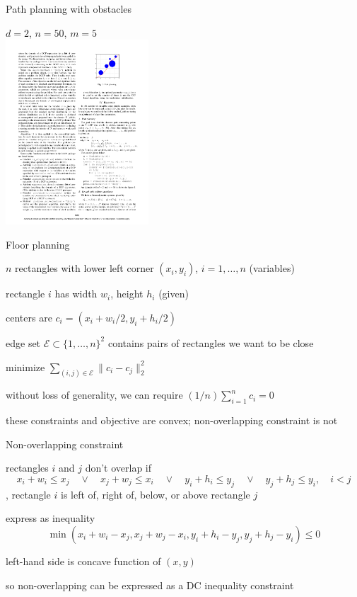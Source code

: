\documentclass[aspectratio=169,11pt]{beamer}
\begin{document}
\begin{frame}[fragile]{Path planning with obstacles}
\begin{center}
$d=2$, $n=50$, $m=5$ \\
\includegraphics[width=0.4\textwidth]{path_planning.pdf}
\end{center}
\end{frame}

\begin{frame}{Floor planning}
\BIT
\item $n$ rectangles with lower left corner $(x_i, y_i)$, $i=1,\ldots, n$ (variables)
\item rectangle $i$ has width $w_i$, height $h_i$ (given)
\item centers are $c_i = (x_i+w_i/2, y_i + h_i/2)$
\item edge set $\mathcal{E} \subset \{1,\ldots, n\}^2$ 
contains pairs of rectangles we want to be close
\item minimize $\sum_{(i,j)\in \mathcal E} \|c_i - c_j\|_2^2$
\item without loss of generality, we can require
$(1/n)\sum_{i=1}^{n} c_i = 0$
\item these constraints and objective are convex; non-overlapping constraint is not
\EIT
\end{frame}

\begin{frame}{Non-overlapping constraint}
\BIT
\item rectangles $i$ and $j$ don't overlap if
\[
x_i + w_i \leq x_j \quad \lor \quad x_j + w_j \leq x_i \quad \lor \quad
y_i + h_i \leq y_j \quad \lor \quad y_j + h_j \leq y_i, \quad i < j
\]
\ie, rectangle $i$ is left of, right of, below, or above rectangle $j$
\item express as inequality
\[
\min \left(x_i+w_i-x_j, x_j+w_j-x_i, y_i+h_i-y_j, y_j+h_j-y_i\right) \leq 0
\]
\item left-hand side is concave function of $(x,y)$
\item so non-overlapping can be expressed as a DC inequality constraint
\EIT
\end{frame}
\end{document}
